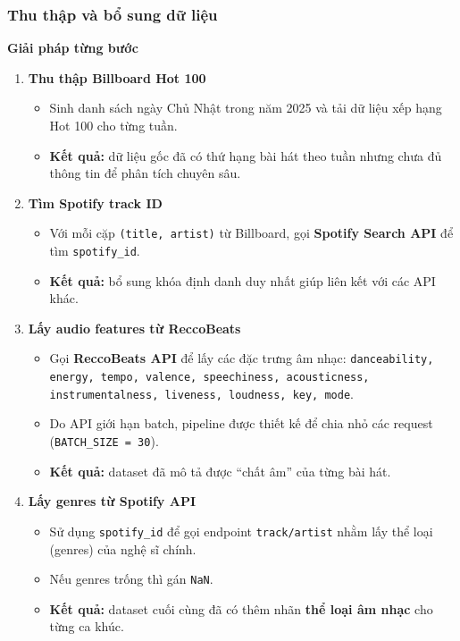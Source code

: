    

\subsubsection{Thu thập và bổ sung dữ liệu }

\textbf{Giải pháp từng bước} 

\begin{enumerate}
    \item \textbf{Thu thập Billboard Hot 100}
    \begin{itemize}
        \item Sinh danh sách ngày Chủ Nhật trong năm 2025 và tải dữ liệu xếp hạng Hot 100 cho từng tuần. 
        \item \textbf{Kết quả:} dữ liệu gốc đã có thứ hạng bài hát theo tuần nhưng chưa đủ thông tin để phân tích chuyên sâu.
    \end{itemize}

    \item \textbf{Tìm Spotify track ID}
    \begin{itemize}
        \item Với mỗi cặp \texttt{(title, artist)} từ Billboard, gọi \textbf{Spotify Search API} để tìm \texttt{spotify\_id}. 
        \item  \textbf{Kết quả:} bổ sung khóa định danh duy nhất giúp liên kết với các API khác.
    \end{itemize}

    \item \textbf{Lấy audio features từ ReccoBeats}
    \begin{itemize}
        \item Gọi \textbf{ReccoBeats API} để lấy các đặc trưng âm nhạc: \texttt{danceability, energy, tempo, valence, speechiness, acousticness, instrumentalness, liveness, loudness, key, mode}.
        \item Do API giới hạn batch, pipeline được thiết kế để chia nhỏ các request (\texttt{BATCH\_SIZE = 30}). 
        \item \textbf{Kết quả:} dataset đã mô tả được ``chất âm'' của từng bài hát.
    \end{itemize}

    \item \textbf{Lấy genres từ Spotify API}
    \begin{itemize}
        \item Sử dụng \texttt{spotify\_id} để gọi endpoint \texttt{track/artist} nhằm lấy thể loại (genres) của nghệ sĩ chính.
        \item Nếu genres trống thì gán \texttt{NaN}.
        \item  \textbf{Kết quả:} dataset cuối cùng đã có thêm nhãn \textbf{thể loại âm nhạc} cho từng ca khúc.
    \end{itemize}


    
\end{enumerate}



